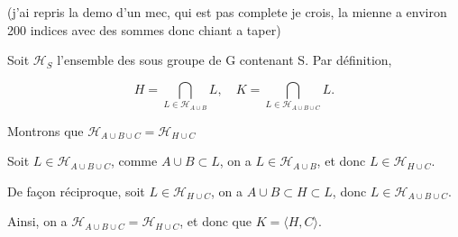 (j'ai repris la demo d'un mec, qui est pas complete je crois, la mienne a environ 200 indices avec des sommes donc chiant a taper)


Soit $\mathcal{H}_S$ l'ensemble des sous groupe de G contenant S. Par définition,

\[H = \displaystyle \bigcap_{L \in \mathcal{H}_{A \cup B}} L,\quad K = \bigcap_{L \in\mathcal{H}_{A \cup B \cup C}} L.\]

Montrons que $ \mathcal{H}_{A \cup B \cup C} = \mathcal{H}_{H \cup C}$


Soit $L \in  \mathcal{H}_{A \cup B \cup C}$, comme $A \cup B \subset L$, on a $L \in  \mathcal{H}_{A \cup B} $, et donc $L \in \mathcal{H}_{H \cup C} $.

De façon réciproque, soit $L \in  \mathcal{H}_{H \cup C}$, on a $A \cup B \subset H \subset L$, donc $L \in  \mathcal{H}_{A \cup B \cup C}$.

Ainsi, on a $ \mathcal{H}_{A \cup B \cup C} = \mathcal{H}_{H \cup C}$, et donc que $K = \langle H, C \rangle$.